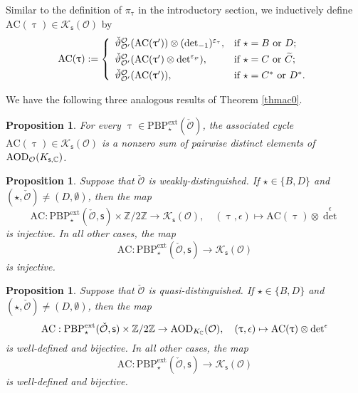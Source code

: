 \documentclass[12pt,a4paper]{amsart}
\def\abs#1{\left|{#1}\right|}
\newcommand{\CK}{{\mathcal {K}}}
\newcommand{\CO}{{\mathcal {O}}}
\newcommand{\g}{\mathfrak g}
\newcommand{\Z}{\mathbb{Z}}
\numberwithin{equation}{section}
\newtheorem{prop}[thm]{Proposition}
\theoremstyle{remark}
\def\PBPe{\mathrm{PBP}^{\mathrm{ext}}}
\begin{document}


Similar to the definition of $\pi_\uptau$ in the introductory section, we inductively define
$\mathrm{AC}(\uptau)\in \CK_{\mathsf s}(\CO) $ by
 \[
   \mathrm{AC}(\uptau):=\left\{
     \begin{array}{ll}
         \check \vartheta_{\CO'}^{\CO}(\mathrm{AC}(\uptau'))\otimes ({\det}_{-1})^{\varepsilon_{\tau}}, &\hbox{if  $\star=B$ or $D$}; \smallskip\\
         \check \vartheta_{\CO'}^{\CO}(\mathrm{AC}(\uptau')\otimes \det^{\varepsilon_{\wp}}), &\hbox{if $\star=C$ or $\widetilde C$};\smallskip \\
              \check \vartheta_{\CO'}^{\CO}(\mathrm{AC}(\uptau')), &\hbox{if $\star=C^*$ or $D^*$}. \\
            \end{array}
   \right.
 \]

We have the following three analogous results of Theorem \ref{thmac0}.

\begin{prop}\label{thmac1}
 For every $\uptau\in \PBPe_\star(\check \CO)$,  the associated cycle $\mathrm{AC}(\uptau)\in \CK_{\mathsf s}(\CO)$ is a nonzero  sum of  pairwise distinct elements of $\mathrm{AOD}_{\CO}(K_{\mathsf s, \C})$.


\end{prop}


\begin{prop}\label{thmac2}
Suppose that  $\check \CO$ is weakly-distinguished.  If $\star\in \{B,D\}$ and $(\star, \check \CO)\neq (D, \emptyset)$, then  the map
\[
\mathrm{AC}: \PBPe_\star(\check \CO,\mathsf s)\times \Z/2\Z \rightarrow  \CK_{\mathsf s}(\CO),\quad (\uptau, \epsilon)\mapsto \mathrm{AC}(\uptau)\otimes {\det}^{\epsilon}
\]
is injective. In all other cases, the
map
\[
\mathrm{AC}: \PBPe_\star(\check \CO,\mathsf s)\rightarrow  \CK_{\mathsf s}(\CO)
\]
is injective.
\end{prop}




\begin{prop}\label{thmac3}
Suppose that  $\check \CO$ is quasi-distinguished.  If $\star\in \{B,D\}$ and $(\star, \check \CO)\neq (D, \emptyset)$, then  the map
\[
\mathrm{AC}: \PBPe_\star(\check \CO,\mathsf s)\times \Z/2\Z \rightarrow  \mathrm{AOD}_{K_\C}(\CO),\quad (\uptau, \epsilon)\mapsto \mathrm{AC}(\uptau)\otimes {\det}^{\epsilon}
\]
is well-defined and bijective. In all other cases, the
map
\[
\mathrm{AC}: \PBPe_\star(\check \CO,\mathsf s)\rightarrow  \CK_{\mathsf s}(\CO)
\]
is well-defined and bijective.
\end{prop}
\end{document}

